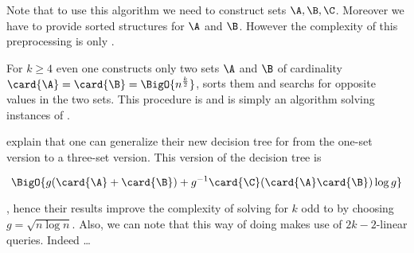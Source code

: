 Note that to use this algorithm we need to construct sets \(\A,\B,\C\).
Moreover we have to provide sorted structures for \(\A\) and \(\B\). However
the complexity of this preprocessing is only .

For \(k \ge 4\) even one constructs only two sets \(\A\) and \(\B\) of cardinality
\(\card{\A} = \card{\B} = \BigO{n^{\frac{k}{2}}}\), sorts them and searchs for
opposite values in the two sets. This procedure is  and is simply an algorithm solving instances of \twoSUM.

\citet*{gronlund:2014} explain that one can generalize their new decision tree for
\threeSUM from the one-set version to a three-set version. This version of the
decision tree is

\begin{displaymath}
\BigO{g(\card{\A}+\card{\B}) + g^{-1}\card{\C}(\card{\A}\card{\B})\log g}
\end{displaymath}

, hence their results improve the complexity of solving \kLDT for \(k\) odd to
 by choosing \(g = \sqrt{n \log n}\).
Also, we can note that this way of doing makes use of \(2k-2\)-linear queries.
Indeed \dots 
